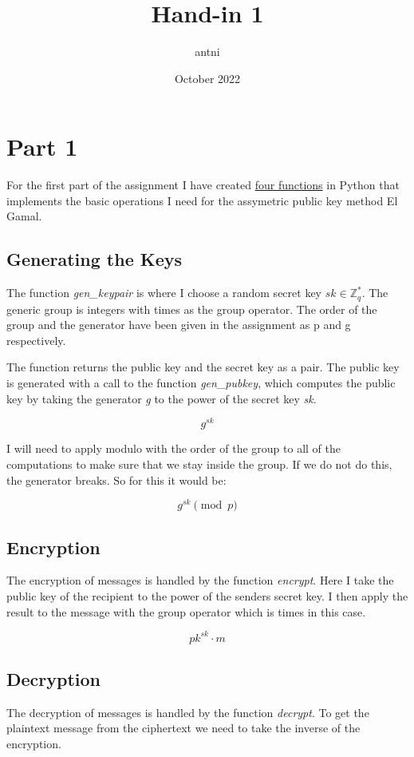 \documentclass{article}
\title{Hand-in 1}
\author{antni}
\date{October 2022}
\begin{document}
\maketitle

\section{Part 1}

For the first part of the assignment I have created \hyperref[subsec:result1]{four functions} in Python that implements the basic operations I need for the assymetric public key method El Gamal.


\subsection{Generating the Keys}
The function \textit{gen\_keypair} is where I choose a random secret key \(sk \in \mathbb{Z}^*_q\). The generic group is integers with times as the group operator. The order of the group and the generator have been given in the assignment as p and g respectively.

The function returns the public key and the secret key as a pair. The public key is generated with a call to the function \textit{gen\_pubkey}, which computes the public key by taking the generator \textit{g} to the power of the secret key \textit{sk}.

\[g^{sk}\]

I will need to apply modulo with the order of the group to all of the computations to make sure that we stay inside the group. If we do not do this, the generator breaks. So for this it would be:

\[g^{sk} \pmod p\]


\subsection{Encryption}
The encryption of messages is handled by the function \textit{encrypt}.
Here I take the public key of the recipient to the power of the senders secret key.
I then apply the result to the message with the group operator which is times in this case.

\[pk^{sk} \cdot m\]

\newpage

\subsection{Decryption}
The decryption of messages is handled by the function \textit{decrypt}.
To get the plaintext message from the ciphertext we need to take the inverse of the encryption.
\end{document}
